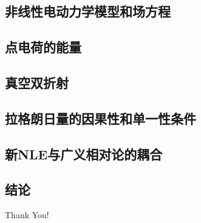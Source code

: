 \documentclass[9pt, dvipsnames]{beamer} %
\begin{document}
\subsection{非线性电动力学模型和场方程}

\subsection{点电荷的能量}

\subsection{真空双折射}

\subsection{拉格朗日量的因果性和单一性条件}

\subsection{新NLE与广义相对论的耦合}

\subsection{结论}
    
\begin{frame}[noframenumbering]
    \centering
    {\fontsize{40}{50}\selectfont Thank You!}
\end{frame}
\end{document}
